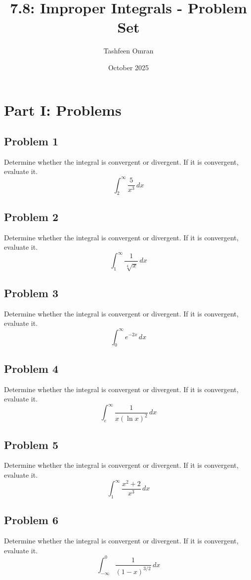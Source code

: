 \documentclass{article}
\title{7.8: Improper Integrals - Problem Set}
\author{Tashfeen Omran}
\date{October 2025}
\begin{document}
\maketitle

\section*{Part I: Problems}

\subsection*{Problem 1}
Determine whether the integral is convergent or divergent. If it is convergent, evaluate it.
\[ \int_{2}^{\infty} \frac{5}{x^3} \,dx \]

\subsection*{Problem 2}
Determine whether the integral is convergent or divergent. If it is convergent, evaluate it.
\[ \int_{1}^{\infty} \frac{1}{\sqrt[4]{x}} \,dx \]

\subsection*{Problem 3}
Determine whether the integral is convergent or divergent. If it is convergent, evaluate it.
\[ \int_{0}^{\infty} e^{-2x} \,dx \]

\subsection*{Problem 4}
Determine whether the integral is convergent or divergent. If it is convergent, evaluate it.
\[ \int_{e}^{\infty} \frac{1}{x (\ln x)^2} \,dx \]

\subsection*{Problem 5}
Determine whether the integral is convergent or divergent. If it is convergent, evaluate it.
\[ \int_{1}^{\infty} \frac{x^2 + 2}{x^3} \,dx \]

\subsection*{Problem 6}
Determine whether the integral is convergent or divergent. If it is convergent, evaluate it.
\[ \int_{-\infty}^{0} \frac{1}{(1-x)^{3/2}} \,dx \]
\end{document}
